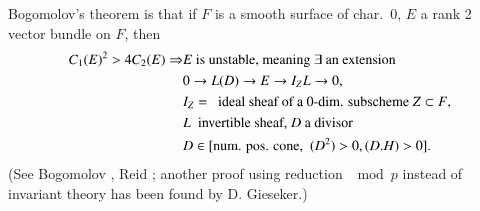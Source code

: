 Bogomolov's theorem is that if $F$ is a smooth surface of char.~0, $E$
a rank 2 vector bundle on $F$, then 
\begin{align}
C_{1}(E)^{2}>4C_{2}(E) \Rightarrow & E\text{~is unstable, meaning
$\exists$ an extension}\notag\\
 & 0\to L(D)\to E\to I_{Z}L\to 0,\notag\\
 & I_{Z}=\text{~ ideal sheaf of a 0-dim. subscheme $Z\subset F$,}\notag\\
 & L\text{~ invertible sheaf, $D$ a divisor}\notag\\
 & D\in [\text{num. pos. cone,~ }(D^{2})>0,(D.H)>0].\label{art01-2}
\end{align}\pageoriginale
(See Bogomolov \cite{art01-key2}, Reid \cite{art01-key13}; another
proof using reduction $\mod p$ instead of invariant theory has been
found by D. Gieseker.)

